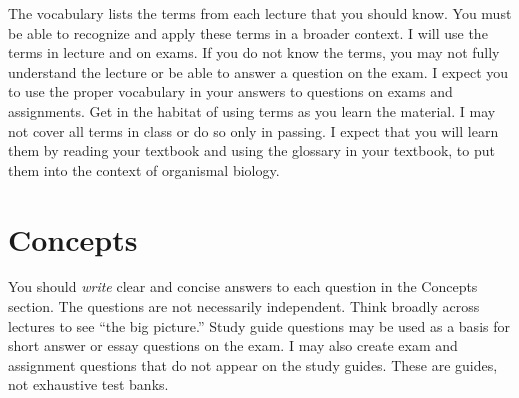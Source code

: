 \documentclass[letterpaper]{tufte-handout}
\begin{document}
The vocabulary lists the terms from each lecture that you should know. You must be able to recognize and apply these terms in a broader context.  I will use the terms in lecture and on exams. If you do not know the terms, you may not fully understand the lecture or be able to answer a question on the exam. I expect you to use the proper vocabulary in your answers to questions on exams and assignments.  Get in the habitat of using terms as you learn the material.  I may not cover all terms in class or do so only in passing.  I expect that you will learn them by reading your textbook and using the glossary in your textbook, to put them into the context of organismal biology.

\section{Concepts}

You should \emph{write} clear and concise answers to each question in the Concepts section.  The questions are not necessarily independent.  Think broadly across lectures to see ``the big picture.''  Study guide questions may be used as a basis for short answer or essay questions on the exam. I may also create exam and assignment questions that do not appear on the study guides. These are guides, not exhaustive test banks.
\end{document}
